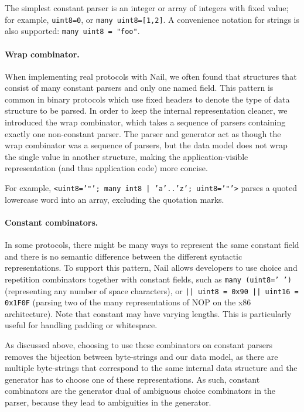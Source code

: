 The simplest constant parser is an integer or array of integers with fixed
value; for example, \texttt{uint8=0}, or \texttt{many uint8=[1,2]}. A convenience notation
for strings is also supported: \texttt{many uint8 = "foo"}.

\paragraph{Wrap combinator.} When implementing real protocols with Nail, we often found that
structures that consist of many constant parsers and only one named field. This pattern is
common in binary protocols which use fixed headers to denote the type of data
structure to be parsed.  In order to keep the internal representation cleaner,
we introduced the wrap combinator, which takes a sequence of parsers containing
exactly one non-constant parser. The parser and generator act as though the wrap
combinator was a sequence of parsers, but the data model does not wrap the
single value in another structure, making the application-visible representation
(and thus application code) more concise.

For example, \texttt{<uint8='"'; many int8 | 'a'..'z'; uint8='"'>} parses a quoted
lowercase word into an array, excluding the quotation marks.

\paragraph{Constant combinators.}
In some protocols, there might be many ways to represent the same constant field
and there is no semantic difference between the different syntactic representations.
To support this pattern, Nail allows developers to use choice and repetition
combinators together with constant fields, such as
\texttt{many (uint8=' ')} (representing any number of space characters), or
\texttt{|| uint8 = 0x90 || uint16 = 0x1F0F} (parsing two of the many representations of NOP on the
x86 architecture). Note that constant may have varying lengths.
This is particularly useful for handling padding or whitespace.

As discussed above, choosing to use these combinators on constant parsers
removes the bijection between byte-strings and our data model, as there are
multiple byte-strings that correspond to the same internal data structure and
the generator has to choose one of these representations. As such, constant
combinators are the generator dual of ambiguous choice combinators in the
parser, because they lead to ambiguities in the generator.


